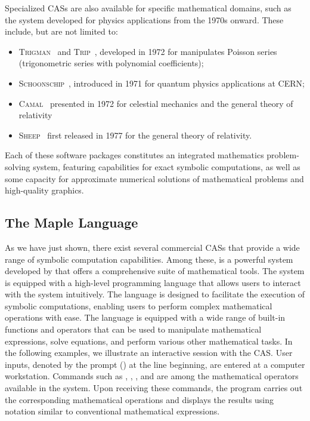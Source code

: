 %
Specialized \acp{CAS} are also available for specific mathematical domains, such as the system developed for physics applications from the 1970s onward. These include, but are not limited to:
%
\begin{itemize}
  \setlength{\itemsep}{0.0em}
  \item \textsc{Trigman}~\cite{jeffreys1972trigman} and \textsc{Trip}~\cite{gastineau2011trip}, developed in 1972 for manipulates Poisson series (trigonometric series with polynomial coefficients);
  \item \textsc{Schoonschip}~\cite{strubbe1974presentation}, introduced in 1971 for quantum physics applications at \ac{CERN};
  \item \textsc{Camal}~\cite{bourne1972camal} presented in 1972 for celestial mechanics and the general theory of relativity
  \item \textsc{Sheep}~\cite{frick1977computer} first released in 1977 for the general theory of relativity.
\end{itemize}
%
Each of these software packages constitutes an integrated mathematics problem-solving system, featuring capabilities for exact symbolic computations, as well as some capacity for approximate numerical solutions of mathematical problems and high-quality graphics.

\subsection{The Maple Language}

As we have just shown, there exist several commercial \acp{CAS} that provide a wide range of symbolic computation capabilities. Among these, \Maple{} is a powerful system developed by \MapleSoft{} that offers a comprehensive suite of mathematical tools. The \Maple{} system is equipped with a high-level programming language that allows users to interact with the system intuitively. The \Maple{} language is designed to facilitate the execution of symbolic computations, enabling users to perform complex mathematical operations with ease. The language is equipped with a wide range of built-in functions and operators that can be used to manipulate mathematical expressions, solve equations, and perform various other mathematical tasks. In the following examples, we illustrate an interactive session with the \Maple{} \ac{CAS}. User inputs, denoted by the prompt (\code{>}) at the line beginning, are entered at a computer workstation. Commands such as , , , and  are among the mathematical operators available in the \Maple{} system. Upon receiving these commands, the program carries out the corresponding mathematical operations and displays the results using notation similar to conventional mathematical expressions.

